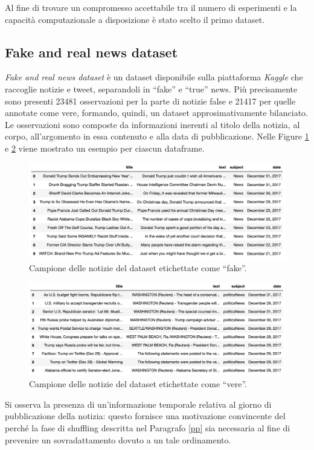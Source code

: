 \documentclass[12pt]{report}
\theoremstyle{definition}
\begin{document}
Al fine di trovare un compromesso accettabile tra il numero di esperimenti e la capacità computazionale a disposizione è stato scelto il primo dataset.

\subsection{Fake and real news dataset}\label{fakenewsdataset}
\textit{Fake and real news dataset} è un dataset disponibile sulla piattaforma \textit{Kaggle} che raccoglie notizie e tweet, separandoli in ``fake'' e ``true'' news. Più precisamente sono presenti 23481 osservazioni per la parte di notizie false e 21417 per quelle annotate come vere, formando, quindi, un dataset approsimativamente bilanciato. 
Le osservazioni sono composte da informazioni inerenti al titolo della notizia, al corpo, all'argomento in essa contenuto e alla data di pubblicazione. Nelle Figure \ref{fake_sample} e \ref{true_sample} viene mostrato un esempio per ciascun dataframe.
\begin{figure}
    \centering
    \includegraphics[scale=0.52]{images/fake_sample.png}
    \caption{Campione delle notizie del dataset etichettate come ``fake''.}
    \label{fake_sample}
\end{figure}
\begin{figure}
    \centering
    \includegraphics[scale=0.5]{images/true_sample.png}
    \caption{Campione delle notizie del dataset etichettate come ``vere''.}
    \label{true_sample}
\end{figure}
Si osserva la presenza di un'informazione temporale relativa al giorno di pubblicazione della notizia: questo fornisce una motivazione convincente del perché la fase di shuffling descritta nel Paragrafo \ref{pp} sia necessaria al fine di prevenire un sovradattamento dovuto a un tale ordinamento.
\end{document}
